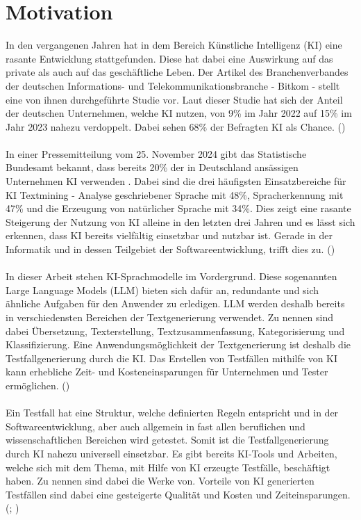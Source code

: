 \documentclass[12pt,toc=bib,toc=listof]{scrreprt}
\begin{document}
\section{Motivation} %
\label{sec:motivation}
In den vergangenen Jahren hat in dem Bereich Künstliche Intelligenz (KI) eine rasante Entwicklung stattgefunden. Diese hat dabei eine Auswirkung auf das private als auch auf das geschäftliche Leben. Der Artikel des Branchenverbandes der deutschen Informations- und Telekommunikationsbranche - Bitkom - stellt eine von ihnen durchgeführte Studie vor. Laut dieser Studie hat sich der Anteil der deutschen Unternehmen, welche KI nutzen, von 9\% im Jahr 2022 auf 15\% im Jahr 2023 nahezu verdoppelt. Dabei sehen 68\% der Befragten KI als Chance. (\cite{StreimHecker2023})\\
\\
In einer Pressemitteilung vom 25. November 2024 gibt das Statistische Bundesamt bekannt, dass bereits 20\% der in Deutschland ansässigen Unternehmen KI verwenden . Dabei sind die drei häufigsten Einsatzbereiche für KI Textmining - Analyse geschriebener Sprache mit 48\%, Spracherkennung mit 47\% und die Erzeugung von natürlicher Sprache mit 34\%. Dies zeigt eine rasante Steigerung der Nutzung von KI alleine in den letzten drei Jahren und es lässt sich erkennen, dass KI bereits vielfältig einsetzbar und nutzbar ist. Gerade in der Informatik und in dessen Teilgebiet der Softwareentwicklung, trifft dies zu. (\cite{StatistischesBundesamt2024})\\
\\
In dieser Arbeit stehen KI-Sprachmodelle im Vordergrund. Diese sogenannten Large Language Models (LLM) bieten sich  dafür an, redundante und sich ähnliche Aufgaben für den Anwender zu erledigen. LLM werden deshalb bereits in verschiedensten Bereichen der Textgenerierung verwendet. Zu nennen sind dabei Übersetzung, Texterstellung, Textzusammenfassung, Kategorisierung und Klassifizierung. Eine Anwendungsmöglichkeit der Textgenerierung ist deshalb die Testfallgenerierung durch die KI. Das Erstellen von Testfällen mithilfe von KI kann erhebliche Zeit- und Kosteneinsparungen für Unternehmen und Tester ermöglichen. (\cite{Kerner2024})\\
\\
Ein Testfall hat eine Struktur, welche definierten Regeln entspricht und in der Softwareentwicklung, aber auch allgemein in fast allen beruflichen und wissenschaftlichen Bereichen wird getestet. Somit ist die Testfallgenerierung durch KI nahezu universell einsetzbar. Es gibt bereits KI-Tools und Arbeiten, welche sich mit dem Thema, mit Hilfe von KI erzeugte Testfälle, beschäftigt haben. Zu nennen sind dabei die Werke von. Vorteile von KI generierten Testfällen sind dabei eine gesteigerte Qualität und Kosten und Zeiteinsparungen. (\cite{Bozic2022}; \cite{WeingartzSuleymanov2024})\\
\end{document}
